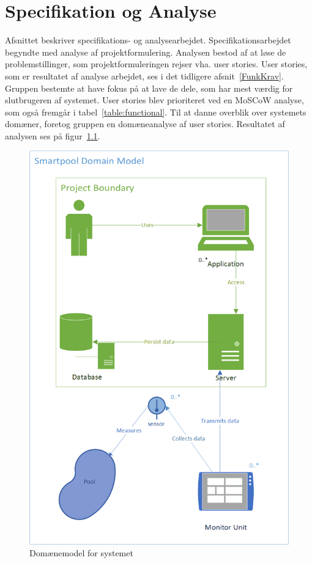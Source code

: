 \chapter{Specifikation og Analyse}\label{SpecOgAnalyse}
Afsnittet beskriver specifikations- og analysearbejdet. Specifikationsarbejdet begyndte med analyse af projektformulering. Analysen bestod af at løse de problemstillinger, som projektformuleringen rejser vha. user stories. User stories, som er resultatet af analyse arbejdet, ses i det tidligere afsnit~\ref{FunkKrav}. Gruppen bestemte at have fokus på at lave de dele, som har mest værdig for slutbrugeren af systemet. User stories blev prioriteret ved en MoSCoW analyse, som også fremgår i tabel~\ref{table:functional}. Til at danne overblik over systemets domæner, foretog gruppen en domæneanalyse af user stories. Resultatet af analysen ses på figur~\ref{fig:domainmodelboundary}.

\begin{figure}
	\centering
	\includegraphics[width=0.7\linewidth]{figs/ProjectBoundary}
	\caption{Domænemodel for systemet}
	\label{fig:domainmodelboundary}
\end{figure}

